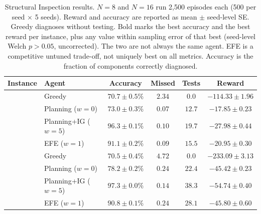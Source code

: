 \begin{table}[ht]
\centering
\caption{Structural Inspection results. $N{=}8$ and $N{=}16$ run 2{,}500 episodes each (500 per seed $\times$ 5 seeds). Reward and accuracy are reported as mean $\pm$ seed-level SE. Greedy diagnoses without testing. Bold marks the best accuracy and the best reward per instance, plus any value within sampling error of that best (seed-level Welch $p > 0.05$, uncorrected). The two are not always the same agent. EFE is a competitive untuned trade-off, not uniquely best on all metrics. Accuracy is the fraction of components correctly diagnosed.}
\label{tab:inspection}
\begin{tablebody}
\begin{tabular}{llcccc}
\toprule
Instance & Agent & Accuracy & Missed & Tests & Reward \\
\midrule
{} & Greedy & $70.7 \pm 0.5\%$ & $2.34$ & $0.0$ & $-114.33 \pm 1.96$ \\
& Planning ($w{=}0$) & $73.0 \pm 0.3\%$ & $0.07$ & $12.7$ & $\mathbf{-17.85 \pm 0.23}$ \\
& Planning+IG ($w{=}5$) & $\mathbf{96.3 \pm 0.1\%}$ & $0.10$ & $19.7$ & $-27.98 \pm 0.44$ \\
& EFE ($w{=}1$) & $91.1 \pm 0.2\%$ & $0.09$ & $15.5$ & $-20.95 \pm 0.30$ \\
\midrule
{} & Greedy & $70.5 \pm 0.4\%$ & $4.72$ & $0.0$ & $-233.09 \pm 3.13$ \\
& Planning ($w{=}0$) & $78.2 \pm 0.2\%$ & $0.24$ & $22.4$ & $\mathbf{-45.42 \pm 0.23}$ \\
& Planning+IG ($w{=}5$) & $\mathbf{97.3 \pm 0.0\%}$ & $0.14$ & $38.3$ & $-54.74 \pm 0.40$ \\
& EFE ($w{=}1$) & $90.8 \pm 0.1\%$ & $0.24$ & $28.1$ & $\mathbf{-45.80 \pm 0.60}$ \\
\bottomrule
\end{tabular}
\end{tablebody}
\end{table}

